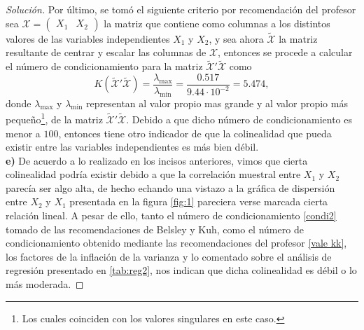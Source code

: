 \documentclass[10.5pt,notitlepage]{article}
\newenvironment{solucion}
  {\begin{proof}[Solución]}
  {\end{proof}}
\theoremstyle{plain}
\begin{document}
\begin{solucion}
Por último, se tomó el siguiente criterio por recomendación del profesor sea \(\mathcal{X} = \begin{pmatrix} X_1 & X_2 \end{pmatrix}\) la matriz que contiene como columnas a los distintos valores de las variables independientes \(X_1\) y \(X_2\), y sea ahora \(\tilde{\mathcal{X}}\) la matriz resultante de centrar y escalar las columnas de \(\mathcal{X}\), entonces se procede a calcular el número de condicionamiento para la matriz \(\tilde{\mathcal{X}}'\tilde{\mathcal{X}}\) como 
\begin{equation}\label{vale kk}
    K(\tilde{\mathcal{X}}'\tilde{\mathcal{X}}) = \frac{\lambda_{\max}}{\lambda_{\min}} = \frac{0.517}{9.44\cdot 10^{-2}}=5.474,
\end{equation}
donde \(\lambda_{\max}\) y \(\lambda_{\min}\) representan al valor propio mas grande y al valor propio más pequeño\footnote{Los cuales coinciden con los valores singulares en este caso.}, de la matriz \(\tilde{\mathcal{X}}'\tilde{\mathcal{X}}\). Debido a que dicho número de condicionamiento es menor a \(100\), entonces tiene otro indicador de que la colinealidad que pueda existir entre las variables independientes es más bien débil.\\ 

\noindent \textbf{e)} De acuerdo a lo realizado en los incisos anteriores, vimos que cierta colinealidad podría existir debido a que la correlación muestral entre \(X_1\) y \(X_2\) parecía ser algo alta, de hecho echando una vistazo a la gráfica de dispersión entre \(X_2\) y \(X_1\) presentada en la figura \ref{fig:1} pareciera verse marcada cierta relación lineal. A pesar de ello, tanto el número de condicionamiento \eqref{condi2} tomado de las recomendaciones de Belsley y Kuh, como el número de condicionamiento obtenido mediante las recomendaciones del profesor \eqref{vale kk}, los factores de la inflación de la varianza y lo comentado sobre el análisis de regresión presentado en \ref{tab:reg2}, nos indican que dicha colinealidad es débil o lo más moderada.
\end{solucion}
\end{document}
